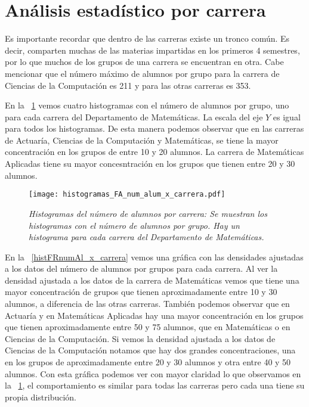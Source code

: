 \section{Análisis estadístico por carrera}

Es importante recordar que dentro de las carreras existe un tronco común. Es decir, comparten muchas de las materias impartidas en los primeros 4 semestres, por lo que muchos de los grupos de una carrera se encuentran en otra. Cabe mencionar que el número máximo de alumnos por grupo para la carrera de Ciencias de la Computación es 211 y para las otras carreras es 353.

En la \figurename{~\ref{histFAnumAl_x_carrera}} vemos cuatro histogramas con el número de alumnos por grupo, uno para cada carrera del Departamento de Matemáticas. La escala del eje $Y$ es igual para todos los histogramas. De esta manera podemos observar que en las carreras de Actuaría, Ciencias de la Computación y Matemáticas, se tiene la mayor concentración en los grupos de entre 10 y 20 alumnos. La carrera de Matemáticas Aplicadas tiene su mayor concesntración en los grupos que tienen entre 20 y 30 alumnos.

\begin{figure}[H]
\centering
\texttt{[image: histogramas\_FA\_num\_alum\_x\_carrera.pdf]} %
\caption[\textit{Histogramas del número de alumnos por carrera}]{\textit{Histogramas del número de alumnos por carrera: Se muestran los histogramas con el número de alumnos por grupo. Hay un histograma para cada carrera del Departamento de Matemáticas.}}\label{histFAnumAl_x_carrera}
\end{figure}


En la \figurename{~\ref{histFRnumAl_x_carrera}} vemos una gráfica con las densidades ajustadas a los datos del número de alumnos por grupos para cada carrera. Al ver la densidad ajustada a los datos de la carrera de Matemáticas vemos que tiene una mayor concentración de grupos que tienen aproximadamente entre 10 y 30 alumnos, a diferencia de las otras carreras. También podemos observar que en Actuaría y en Matemáticas Aplicadas hay una mayor concentración en los grupos que tienen aproximadamente entre 50 y 75 alumnos, que en Matemáticas o en Ciencias de la Computación. Si vemos la densidad ajustada a los datos de Ciencias de la Computación notamos que hay dos grandes concentraciones, una en los grupos de aproximadamente entre 20 y 30 alumnos y otra entre 40 y 50 alumnos. Con esta gráfica podemos ver con mayor claridad lo que observamos en la \figurename{~\ref{histFAnumAl_x_carrera}}, el comportamiento es similar para todas las carreras pero cada una tiene su propia distribución.

